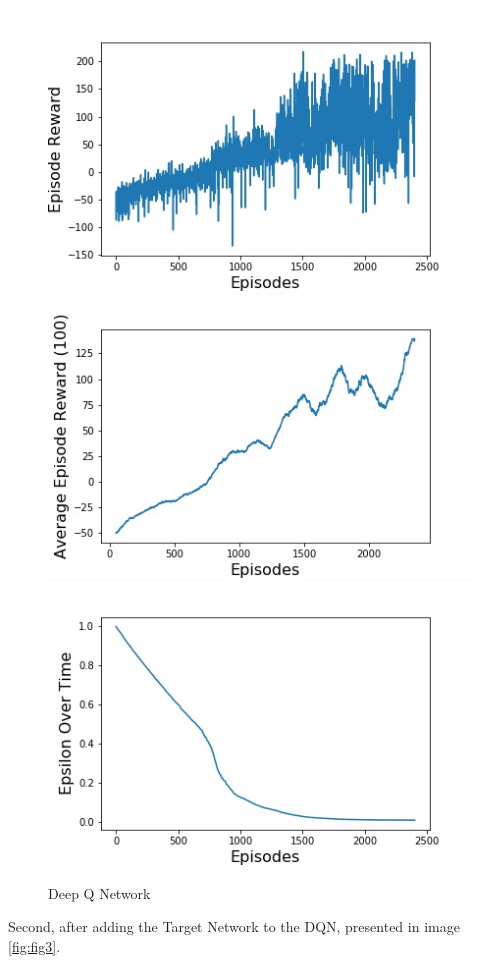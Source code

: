 \documentclass{article}
\begin{document}
\begin{figure}[H]
\centering
\includegraphics[scale=0.25]{rewardOverEpisodesDQN-NormalMemory}
\includegraphics[scale=0.25]{movingAverageDQN-NormalMemory}
\includegraphics[scale=0.25]{epsilonDQN-NormalMemory}
\caption{Deep Q Network}
\label{fig:fig2}
\end{figure}

Second, after adding the Target Network to the DQN, presented in image \ref{fig:fig3}.
\end{document}
